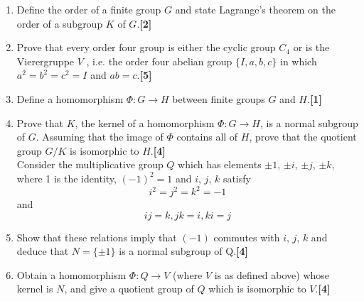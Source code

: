 \documentclass[a4paper]{article}
\begin{document}
\begin{qns}\leavevmode
\begin{enumerate}[label=(\roman*)]
    \item Define the order of a finite group $G$ and state Lagrange’s theorem on the order of a subgroup $K$ of $G$.\hfill\textbf{[2]}
    \item Prove that every order four group is either the cyclic group $C_4$ or is the Vierergruppe $V$ , i.e. the order four abelian group $\{I, a, b, c\}$ in which $a^2 = b^2 = c^2 = I$ and $ab = c$.\hfill\textbf{[5]}
    \item Define a homomorphism $\Phi:G\rightarrow H$ between finite groups $G$ and $H$.\hfill\textbf{[1]}
    \item Prove that $K$, the kernel of a homomorphism $\Phi:G\rightarrow H$, is a normal subgroup of $G$. Assuming that the image of $\Phi$ contains all of $H$, prove that the quotient group $G/K$ is isomorphic to $H$.\hfill\textbf{[4]}\\[5pt]
    Consider the multiplicative group $Q$ which has elements $\pm1$, $\pm i$, $\pm j$, $\pm k$, where 1 is the identity, $(−1)^2 = 1$ and $i$, $j$, $k$ satisfy
$$i^2 = j^2 = k^2 = −1$$
and
$$ij = k, jk = i, ki = j$$
\item Show that these relations imply that $(−1)$ commutes with $i$, $j$, $k$ and deduce that $N = \{\pm 1\}$ is a normal subgroup of Q.\hfill\textbf{[4]}
    \item Obtain a homomorphism $\Phi:Q\rightarrow V$ (where $V$ is as defined above) whose kernel is
$N$, and give a quotient group of $Q$ which is isomorphic to $V$.\hfill\textbf{[4]}
\end{enumerate}
\end{qns}
\end{document}
